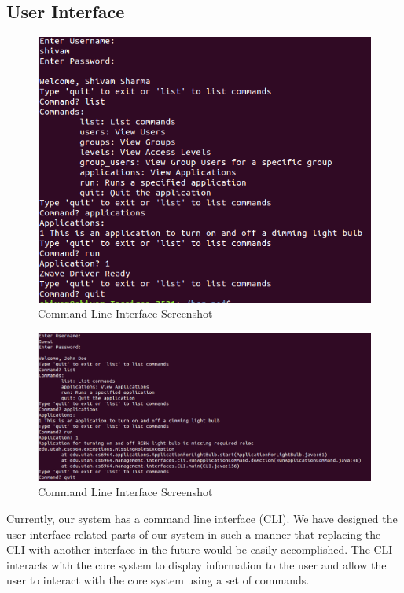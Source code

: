 \subsection{User Interface}
\label{sec:interface}
\begin{figure}[tbh]                                                             
    \centering                                                                  
    \includegraphics[width=1.0\columnwidth]{figs/cli.png}                
    \caption{Command Line Interface Screenshot}                                                      
    \label{Fig:cli}                                                            
\end{figure}
\begin{figure}[tbh]                                                             
    \centering                                                                  
    \includegraphics[width=1.0\columnwidth]{figs/cli2.png}                
    \caption{Command Line Interface Screenshot}                                                      
    \label{Fig:cli2}                                                            
\end{figure}
Currently, our system has a command line interface (CLI). We have designed the
user interface-related parts of our system in such a manner that replacing the
CLI with another interface in the future would be easily accomplished. The CLI
interacts with the core system to display information to the user and allow the
user to interact with the core system using a set of commands.

